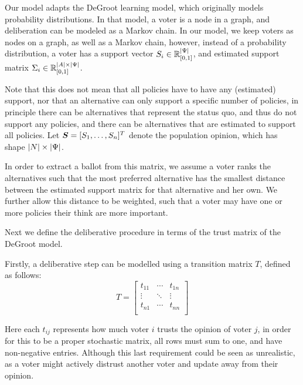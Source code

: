 Our model adapts the DeGroot learning model, which
originally models probability distributions. In that model, a voter is
a node in a graph, and deliberation can be modeled as a Markov chain. In our
model, we keep voters as nodes on a graph, as well as a Markov chain, however,
instead of a probability distribution, a voter has a support vector $S_i \in
\mathbb{R}^{|\Psi|}_{[0,1]}$, and estimated support matrix $\Sigma_i\in
\mathbb{R}^{|A| \times |\Psi|}_{[0,1]}$.

Note that this does not mean that all policies have to have any (estimated)
support, nor that an alternative can only support a specific number of
policies, in principle there can be alternatives that represent the status quo,
and thus do not support any policies, and there can be alternatives that are
estimated to support all policies.  Let $\boldsymbol{S}= [S_1, \dots,
S_{n}]^{T}$ denote the population opinion, which has shape \(|N|
\times |\Psi|\).

In order to extract a ballot from this matrix, we assume a voter ranks the
alternatives such that the most preferred alternative has the smallest distance
between the estimated support matrix for that alternative and her own. We
further allow this distance to be weighted, such that a voter may have one or
more policies their think are more important. 


Next we define the deliberative procedure in terms of the trust matrix of the
DeGroot model.

Firstly, a deliberative step can be modelled using a transition matrix $T$,
defined as follows: \[ T=\begin{bmatrix} t_{11} & \cdots  & t_{1n} \\ \vdots &
\ddots & \vdots \\ t_{n1} & \cdots  & t_{nn} \\ \end{bmatrix} \]

Here each $t_{ij}$ represents how much voter $i$ trusts the opinion of voter
$j$, in order for this to be a proper stochastic matrix, all rows must sum to
one, and have non-negative entries. Although this last requirement could be
seen as unrealistic, as a voter might actively distrust another voter and
update away from their opinion.

